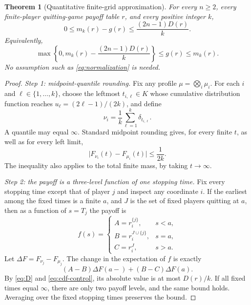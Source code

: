 \documentclass[11pt,a4paper]{article}
\numberwithin{equation}{section}
\theoremstyle{plain}
\newtheorem{theorem}{Theorem}[section]
\theoremstyle{definition}
\theoremstyle{remark}
\begin{document}
\begin{theorem}[Quantitative finite-grid approximation]\label{thm:grid}
For every $n\ge2$, every finite-player quitting-game payoff table
$r$, and every positive integer $k$,
\begin{equation}\label{eq:grid-main}
 0\le m_k(r)-g(r)\le\frac{(2n-1)D(r)}k.
\end{equation}
Equivalently,
\begin{equation}\label{eq:grid-interval}
 \max\!\left\{0,m_k(r)-\frac{(2n-1)D(r)}k\right\}
 \le g(r)\le m_k(r).
\end{equation}
No assumption such as \eqref{eq:normalization} is needed.
\end{theorem}
\begin{proof}
\emph{Step 1: midpoint-quantile rounding.}
Fix any profile $\mu=\bigotimes_i\mu_i$. For each $i$ and
$\ell\in\{1,\ldots,k\}$, choose the leftmost $t_{i,\ell}\in K$
whose cumulative distribution function reaches
$u_\ell=(2\ell-1)/(2k)$, and define
\[
 \nu_i=\frac1k\sum_{\ell=1}^k\delta_{t_{i,\ell}}.
\]
A quantile may equal $\infty$. Standard midpoint rounding gives,
for every finite $t$, as well as for every left limit,
\begin{equation}\label{eq:cdf-control}
 \bigl|F_{\nu_i}(t)-F_{\mu_i}(t)\bigr|\le\frac1{2k}.
\end{equation}
The inequality also applies to the total finite mass, by taking
$t\to\infty$.

\emph{Step 2: the payoff is a three-level function of one stopping
time.} Fix every stopping time except that of player $j$ and inspect
any coordinate $i$. If the earliest among the fixed times is a finite
$a$, and $J$ is the set of fixed players quitting at $a$, then as a
function of $s=T_j$ the payoff is
\[
 f(s)=\begin{cases}
 A=r_i^{\{j\}},&s<a,\\
 B=r_i^{J\cup\{j\}},&s=a,\\
 C=r_i^J,&s>a.
 \end{cases}
\]
Let $\Delta F=F_{\nu_j}-F_{\mu_j}$. The change in the expectation
of $f$ is exactly
\[
 (A-B)\Delta F(a-)+(B-C)\Delta F(a).
\]
By \eqref{eq:D} and \eqref{eq:cdf-control}, its absolute value is
at most $D(r)/k$. If all fixed times equal $\infty$, there are only
two payoff levels, and the same bound holds. Averaging over the fixed
stopping times preserves the bound.


\end{proof}
\end{document}
